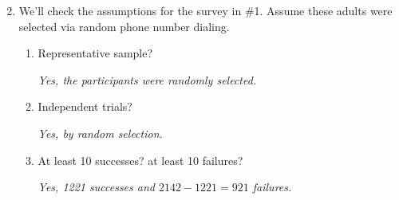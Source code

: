    \begin{enumerate}
     \setcounter{enumi}{1}
   \item We'll check the assumptions for the survey in \#1.  Assume
     these adults were selected via random phone number dialing.
     \begin{enumerate}
        \item Representative sample?   
\begin{students}
        \vspace{.7cm}        
\end{students}

\begin{key}
  {\it Yes, the participants were randomly selected.}
\end{key}
        \item Independent trials?   
\begin{students}
        \vspace{.7cm}        
\end{students}

\begin{key}
  {\it Yes, by random selection.}
\end{key}
        \item At least 10 successes? at least 10 failures?   
\begin{students}
        \vspace{.7cm}        
\end{students}

\begin{key}
  {\it  Yes, 1221 successes and $2142-1221 = 921$ failures.}
\end{key}
\end{enumerate}


\end{enumerate}
